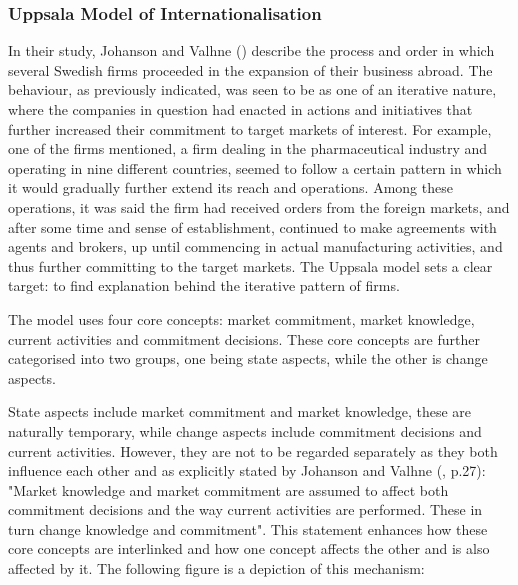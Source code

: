 \documentclass[11pt,a4paper]{article}
\begin{document}
\subsubsection{Uppsala Model of Internationalisation}
\label{uppsala_frame}
  \vspace{-1mm}
\par
In their study, Johanson and Valhne (\citeyear{johansonInternationalizationProcessFirm1977}) describe the process and order in which several Swedish firms proceeded in the expansion of their business abroad. The behaviour, as previously indicated, was seen to be as one of an iterative nature, where the companies in question had enacted in actions and initiatives that further increased their commitment to target markets of interest. For example, one of the firms mentioned, a firm dealing in the pharmaceutical industry and operating in nine different countries, seemed to follow a certain pattern in which it would gradually further extend its reach and operations. Among these operations, it was said the firm had received orders from the foreign markets, and after some time and sense of establishment, continued to make agreements with agents and brokers, up until commencing in actual manufacturing activities, and thus further committing to the target markets. The Uppsala model sets a clear target: to find explanation behind the iterative pattern of firms. \par
The model uses four core concepts: market commitment, market knowledge, current activities and commitment decisions. These core concepts are further categorised into two groups, one being state aspects, while the other is change aspects. \par
State aspects include market commitment and market knowledge, these are naturally temporary, while change aspects include commitment decisions and current activities. However, they are not to be regarded separately as they both influence each other and as explicitly stated by Johanson and Valhne (\citeyear{johansonInternationalizationProcessFirm1977}, p.27): "Market knowledge and market commitment are assumed to affect both commitment decisions and
the way current activities are performed. These in turn change knowledge and commitment". This statement enhances how these core concepts are interlinked and how one concept affects the other and is also affected by it.  The following figure is a depiction of this mechanism: 
\newpage
\end{document}
